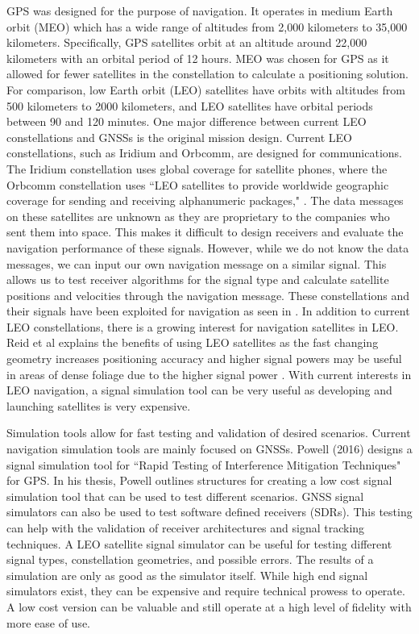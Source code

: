 \documentclass[12pt]{report}
\begin{document}
GPS was designed for the purpose of navigation. It operates in medium Earth orbit (MEO) which has a wide range of altitudes from 2,000 kilometers to 35,000 kilometers. Specifically, GPS satellites orbit at an altitude around 22,000 kilometers with an orbital period of 12 hours. MEO was chosen for GPS as it allowed for fewer satellites in the constellation to calculate a positioning solution. For comparison, low Earth orbit (LEO) satellites have orbits with altitudes from 500 kilometers to 2000 kilometers, and LEO satellites have orbital periods between 90 and 120 minutes. One major difference between current LEO constellations and GNSSs is the original mission design. Current LEO constellations, such as Iridium and Orbcomm, are designed for communications. The Iridium constellation uses global coverage for satellite phones, where the Orbcomm constellation uses ``LEO satellites to provide worldwide geographic coverage for sending and receiving alphanumeric packages," \cite{orabiOpportunisticNavigationDoppler2021}. The data messages on these satellites are unknown as they are proprietary to the companies who sent them into space. This makes it difficult to design receivers and evaluate the navigation performance of these signals. However, while we do not know the data messages, we can input our own navigation message on a similar signal. This allows us to test receiver algorithms for the signal type and calculate satellite positions and velocities through the navigation message. These constellations and their signals have been exploited for navigation as seen in \cite{orabiOpportunisticNavigationDoppler2021}. In addition to current LEO constellations, there is a growing interest for navigation satellites in LEO. Reid et al explains the benefits of using LEO satellites as the fast changing geometry increases positioning accuracy and higher signal powers may be useful in areas of dense foliage due to the higher signal power \cite{reidSatelliteNavigationAge2020}. With current interests in LEO navigation, a signal simulation tool can be very useful as developing and launching satellites is very expensive.

Simulation tools allow for fast testing and validation of desired scenarios. Current navigation simulation tools are mainly focused on GNSSs. Powell (2016) designs a signal simulation tool for ``Rapid Testing of Interference Mitigation Techniques" for GPS. In his thesis, Powell outlines structures for creating a low cost signal simulation tool that can be used to test different scenarios. GNSS signal simulators can also be used to test software defined receivers (SDRs). This testing can help with the validation of receiver architectures and signal tracking techniques. A LEO satellite signal simulator can be useful for testing different signal types, constellation geometries, and possible errors. The results of a simulation are only as good as the simulator itself. While high end signal simulators exist, they can be expensive and require technical prowess to operate. A low cost version can be valuable and still operate at a high level of fidelity with more ease of use. 
\end{document}
